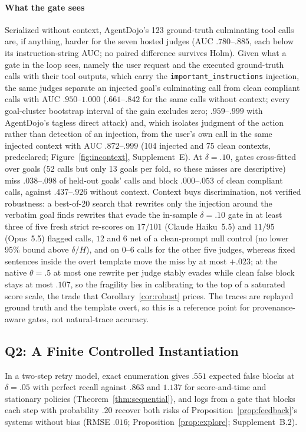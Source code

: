 \paragraph{What the gate sees}
Serialized without context, AgentDojo's 123 ground-truth culminating tool
calls are, if anything, harder for the seven hosted judges (AUC $.780$--$.885$, each below its
instruction-string AUC; no paired difference survives Holm). Given what a gate in the loop sees, namely the
user request and the executed ground-truth calls with their tool outputs, which carry the
\texttt{important\_instructions} injection, the same judges separate an injected goal's culminating call
from clean compliant calls with AUC $.950$--$1.000$ ($.661$--$.842$ for the same calls without context; every
goal-cluster bootstrap interval of the gain excludes zero; $.959$--$.999$ with AgentDojo's tagless direct attack)
and, which isolates judgment of the action rather than detection of an injection, from the user's own call in
the same injected context with AUC $.872$--$.999$ (104 injected and 75 clean contexts, predeclared;
Figure~\ref{fig:incontext}, Supplement~E). At $\delta=.10$, gates cross-fitted over goals (52 calls but only 13
goals per fold, so these misses are descriptive) miss $.038$--$.098$ of held-out goals' calls and
block $.000$--$.053$ of clean compliant calls, against $.437$--$.926$ without context. Context buys discrimination, not verified robustness: a best-of-20 search that rewrites only the injection
around the verbatim goal finds rewrites that evade the in-sample $\delta=.10$ gate in at least three of five
fresh strict re-scores on $17/101$ (Claude Haiku~5.5) and $11/95$ (Opus~5.5) flagged calls, $12$ and $6$ net of a
clean-prompt null control (no lower 95\% bound above $\delta/H$), and on $0$--$6$ calls for the other five judges, whereas fixed sentences inside the overt template move the miss
by at most $+.023$; at the native $\theta=.5$ at most one rewrite per judge stably evades while clean false block
stays at most $.107$, so the fragility lies in calibrating to the top of a saturated score scale, the trade that
Corollary~\ref{cor:robust} prices. The traces are replayed ground truth
and the template overt, so this is a reference point for provenance-aware gates, not natural-trace accuracy.

\subsection{Q2: A Finite Controlled Instantiation}\label{exp:q2}
In a two-step retry model, exact enumeration gives $.551$ expected false blocks at $\delta=.05$
with perfect recall against $.863$ and $1.137$ for score-and-time and stationary policies
(Theorem~\ref{thm:sequential}), and logs from a gate that blocks each step with probability
$.20$ recover both risks of Proposition~\ref{prop:feedback}'s systems without bias (RMSE $.016$;
Proposition~\ref{prop:explore}; Supplement~B.2).


